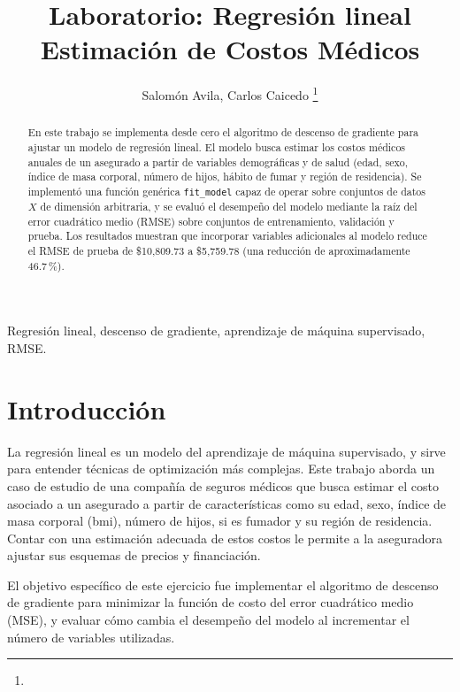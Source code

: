 \documentclass[journal]{IEEEtran}
\begin{document}
\title{Laboratorio: Regresión lineal \\ Estimación de Costos Médicos}

\author{Salomón Avila, Carlos Caicedo
\thanks{}}

\maketitle

\begin{abstract}
En este trabajo se implementa desde cero el algoritmo de descenso de gradiente para ajustar un modelo de regresión lineal. El modelo busca estimar los costos médicos anuales de un asegurado a partir de variables demográficas y de salud (edad, sexo, índice de masa corporal, número de hijos, hábito de fumar y región de residencia). Se implementó una función genérica \texttt{fit\_model} capaz de operar sobre conjuntos de datos $X$ de dimensión arbitraria, y se evaluó el desempeño del modelo mediante la raíz del error cuadrático medio (RMSE) sobre conjuntos de entrenamiento, validación y prueba. Los resultados muestran que incorporar variables adicionales al modelo reduce el RMSE de prueba de \$10{,}809.73 a \$5{,}759.78 (una reducción de aproximadamente 46.7\,\%).
\end{abstract}

\begin{IEEEkeywords}
Regresión lineal, descenso de gradiente, aprendizaje de máquina supervisado, RMSE.
\end{IEEEkeywords}


\section{Introducción}

La regresión lineal es un modelo del aprendizaje de máquina supervisado, y sirve para entender técnicas de optimización más complejas. Este trabajo aborda un caso de estudio de una compañía de seguros médicos que busca estimar el costo asociado a un asegurado a partir de características como su edad, sexo, índice de masa corporal (bmi), número de hijos, si es fumador y su región de residencia. Contar con una estimación adecuada de estos costos le permite a la aseguradora ajustar sus esquemas de precios y financiación.

El objetivo específico de este ejercicio fue implementar el algoritmo de descenso de gradiente para minimizar la función de costo del error cuadrático medio (MSE), y evaluar cómo cambia el desempeño del modelo al incrementar el número de variables utilizadas.
\end{document}
